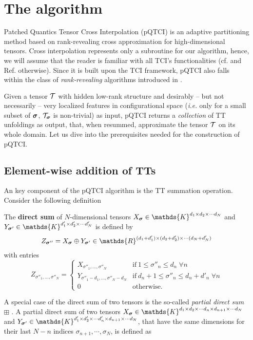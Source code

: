 \section{The algorithm}
\label{sec:patchAlg}

Patched Quantics Tensor Cross Interpolation (pQTCI) is an adaptive partitioning method \cite{Deng2008} based on rank-revealing cross approximation for high-dimensional tensors. Cross interpolation represents only a subroutine for our algorithm, hence, we will assume that the reader is familiar with all TCI's functionalities (cf.  and Ref. \cite{Fernandez2024} otherwise). Since it is built upon the TCI framework, pQTCI also falls within the class of \emph{rank‑revealing} algorithms introduced in .

Given a tensor $\mathcal{T}$ with hidden low-rank structure and desirably -- but not necessarily -- very localized features in configurational space (\textit{i.e.} only for a small subset of $\boldsymbol{\sigma}$, $\mathcal{T}_{\boldsymbol{\sigma}}$ is non-trivial) as input, pQTCI returns a \textit{collection} of TT unfoldings as output, that, when resummed, approximate the tensor $\mathcal{T}$ on its whole domain. Let us dive into the prerequisites needed for the construction of pQTCI.


\subsection{Element-wise addition of TTs}
An key component of the pQTCI algorithm is the TT summation operation. Consider the following definition
\begin{definition}
	The {\normalfont \textbf{direct sum}} of $N$-dimensional tensors $X_{\bsigma} \in \mathds{K}^{d_1 \times d_2 \times \cdots d_N}$ and $Y_{\bsigma'} \in \mathds{K}^{d'_1 \times d'_2 \times \cdots d'_N}$ is defined by 
	\begin{equation}
		Z_{\bsigma''} = X_{\bsigma} \oplus Y_{\bsigma'} \in \mathds{R}^{(d_1+d'_1) \times (d_2+d'_2) \times \cdots (d_N+d'_N)}
	\end{equation}
	with entries
	\begin{equation}
		Z_{\sigma''_1, \dots, \sigma''_N} = \begin{cases}
			X_{\sigma''_1, \dots, \sigma''_N} & \text{if}\ 1\leq \sigma''_n \leq d_n \;\forall n\\
			Y_{\sigma''_1-d_1, \dots, \sigma''_N-d_N} & \text{if}\ d_n + 1\leq \sigma''_n \leq d_n + d'_n \;\forall n\\
			0 & \text{otherwise}.
		\end{cases}
	\end{equation}
\end{definition}
A special case of the direct sum of two tensors is the so-called \textit{partial direct sum} $\boxplus$ \cite{Lee2018}. A partial direct sum of two tensors $X_{\bsigma} \in \mathds{K}^{d_1 \times d_2 \times \cdots d_n \times d_{n+1} \times \cdots d_N}$ and $Y_{\bsigma'} \in \mathds{K}^{d'_1 \times d'_2 \times \cdots d'_n \times d_{n+1} \times \cdots d_N}$, that have the same dimensions for their last $N-n$ indices $\sigma_{n+1}, \cdots, \sigma_{N}$, is defined as 

